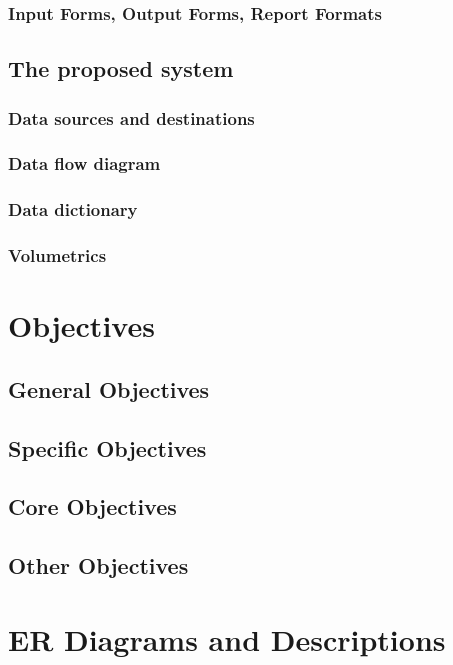 \subsubsection{Input Forms, Output Forms, Report Formats}

\subsection{The proposed system}

\subsubsection{Data sources and destinations}

\subsubsection{Data flow diagram}

\subsubsection{Data dictionary}

\subsubsection{Volumetrics}

\section{Objectives}

\subsection{General Objectives}

\subsection{Specific Objectives}

\subsection{Core Objectives}

\subsection{Other Objectives}

\section{ER Diagrams and Descriptions}

